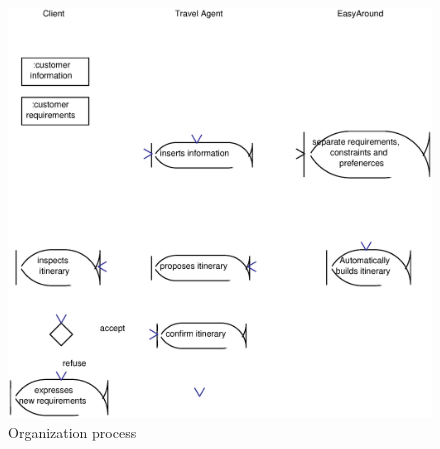 \begin{figure}[h]
\centering
\includegraphics[width=\textwidth]{images/activity.eps}
\caption{Organization process}
\label{fig:orgProcess}
\end{figure}